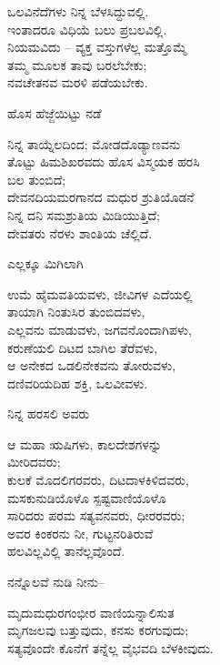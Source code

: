\begin{myquote}
ಒಲವಿನೆದೆಗಳು ನಿನ್ನ ಬೆಳಸಿದ್ದುವಲ್ಲಿ.\\ಇಂತಾದರೂ ವಿಧಿಯೆ ಬಲು ಪ್ರಬಲವಿಲ್ಲಿ.\\ನಿಯಮವಿದು – ವ್ಯಕ್ತ ವಸ್ತುಗಳೆಲ್ಲ ಮತ್ತೊಮ್ಮೆ\\ತಮ್ಮ ಮೂಲಕ ತಾವು ಬರಲೆಬೇಕು;\\ನವಚೇತನವ ಮರಳಿ ಪಡೆಯಬೇಕು.
\end{myquote}

ಹೊಸ ಹೆಜ್ಜೆಯಿಟ್ಟು ನಡೆ

\begin{myquote}
ನಿನ್ನ ತಾಯ್ನೆಲದಿಂದ; ಮೋಡದೊಡ್ಯಾಣವನು\\ತೊಟ್ಟು ಹಿಮಶಿಖರವದು ಹೊಸ ವಿಸ್ಮಯಕ ಹರಸಿ\\ಬಲ ತುಂಬಿದೆ;\\ದೇವನದಿಯಮರಗಾನದ ಮಧುರ ಶ್ರುತಿಯೊಡನೆ\\ನಿನ್ನ ದನಿ ಸಮಶ್ರುತಿಯ ಮಿಡಿಯುತ್ತಿದೆ;\\ದೇವತರು ನೆರಳು ಶಾಂತಿಯ ಚೆಲ್ಲಿದೆ.
\end{myquote}

ಎಲ್ಲಕ್ಕೂ ಮಿಗಿಲಾಗಿ

\begin{myquote}
ಉಮೆ ಹೈಮವತಿಯವಳು, ಜೀವಿಗಳ ಎದೆಯಲ್ಲಿ\\ತಾಯಾಗಿ ನಿಂತುಸಿರ ತುಂಬಿದವಳು,\\ಎಲ್ಲವನು ಮಾಡುವಳು, ಜಗವನೊಂದಾಗಿಪಳು,\\ಕರುಣೆಯಲಿ ದಿಟದ ಬಾಗಿಲ ತೆರೆವಳು,\\ಆ ಅನೇಕದ ಒಡಲಿನೇಕವನು ತೋರುವಳು,\\ದಣಿವರಿಯದಿಹ ಶಕ್ತಿ, ಒಲವೀವಳು.
\end{myquote}

ನಿನ್ನ ಹರಸಲಿ ಅವರು

\begin{myquote}
ಆ ಮಹಾ ಋಷಿಗಳು, ಕಾಲದೇಶಗಳನ್ನು\\ಮೀರಿದವರು;\\ಕುಲಕೆ ಮೊದಲಿಗರವರು, ದಿಟದಾಳಕಿಳಿದವರು,\\ಮಸಕುನುಡಿಯೊಳೊ ಸ್ಪಷ್ಟವಾಣಿಯೊಳೊ\\ಸಾರಿದರು ಪರಮ ಸತ್ಯವನವರು, ಧೀರರವರು;\\ಅವರ ಕಿಂಕರನು ನೀ, ಗುಟ್ಟನರಿತಿರುವೆ\\ಹಲವಿಲ್ಲವಿಲ್ಲಿ ತಾನೆಲ್ಲವೊಂದೆ.
\end{myquote}

ನನ್ನೊಲವೆ ನುಡಿ ನೀನು–

\begin{myquote}
ಮೃದುಮಧುರಗಂಭೀರ ವಾಣಿಯನ್ನಾಲಿಸುತ\\ಮೃಗಜಲವು ಬತ್ತುವುದು, ಕನಸು ಕರಗುವುದು;\\ಸತ್ಯವೊಂದೇ ಕೊನೆಗೆ ತನ್ನೆಲ್ಲ ವೈಭವದಿ ಬೆಳಕೀವುದು.
\end{myquote}

